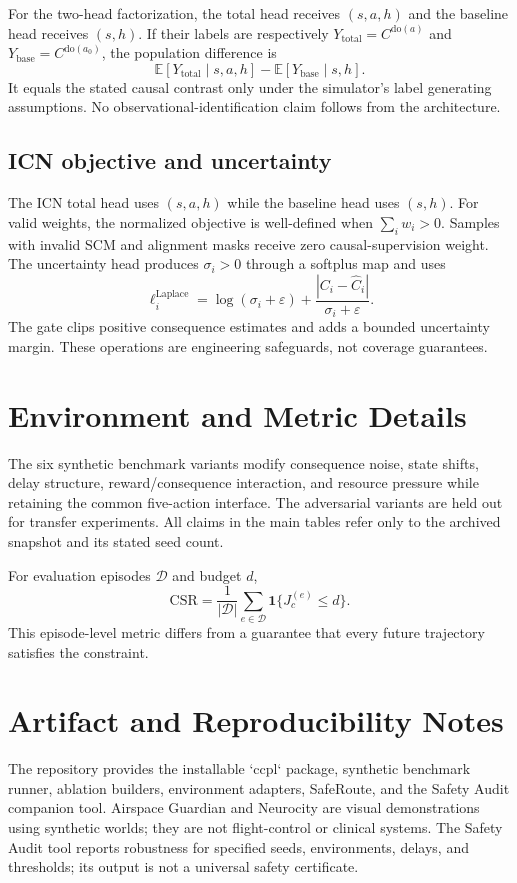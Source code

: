 \documentclass[10pt]{article}
\newcommand{\E}{\mathbb{E}}
\begin{document}
For the two-head factorization, the total head receives $(s,a,h)$ and the
baseline head receives $(s,h)$. If their labels are respectively
$Y_{\mathrm{total}}=C^{\mathrm{do}(a)}$ and
$Y_{\mathrm{base}}=C^{\mathrm{do}(a_0)}$, the population difference is
\begin{equation}
\E[Y_{\mathrm{total}}\mid s,a,h]-
\E[Y_{\mathrm{base}}\mid s,h].
\end{equation}
It equals the stated causal contrast only under the simulator's label
generating assumptions. No observational-identification claim follows from
the architecture.

\subsection{ICN objective and uncertainty}
The ICN total head uses $(s,a,h)$ while the baseline head uses $(s,h)$. For
valid weights, the normalized objective is well-defined when $\sum_iw_i>0$.
Samples with invalid SCM and alignment masks receive zero causal-supervision
weight. The uncertainty head produces $\sigma_i>0$ through a softplus map and
uses
\begin{equation}
\ell_i^{\mathrm{Laplace}}=\log(\sigma_i+\varepsilon)+
\frac{|C_i-\widehat C_i|}{\sigma_i+\varepsilon}.
\end{equation}
The gate clips positive consequence estimates and adds a bounded uncertainty
margin. These operations are engineering safeguards, not coverage guarantees.

\section{Environment and Metric Details}
The six synthetic benchmark variants modify consequence noise, state shifts,
delay structure, reward/consequence interaction, and resource pressure while
retaining the common five-action interface. The adversarial variants are held
out for transfer experiments. All claims in the main tables refer only to the
archived snapshot and its stated seed count.

For evaluation episodes $\mathcal{D}$ and budget $d$,
\begin{equation}
\mathrm{CSR}=\frac{1}{|\mathcal{D}|}\sum_{e\in\mathcal{D}}
\mathbf{1}\{J_c^{(e)}\le d\}.
\end{equation}
This episode-level metric differs from a guarantee that every future
trajectory satisfies the constraint.

\section{Artifact and Reproducibility Notes}
The repository provides the installable `ccpl` package, synthetic benchmark
runner, ablation builders, environment adapters, SafeRoute, and the Safety
Audit companion tool. Airspace Guardian and Neurocity are visual demonstrations
using synthetic worlds; they are not flight-control or clinical systems. The
Safety Audit tool reports robustness for specified seeds, environments, delays,
and thresholds; its output is not a universal safety certificate.
\end{document}
